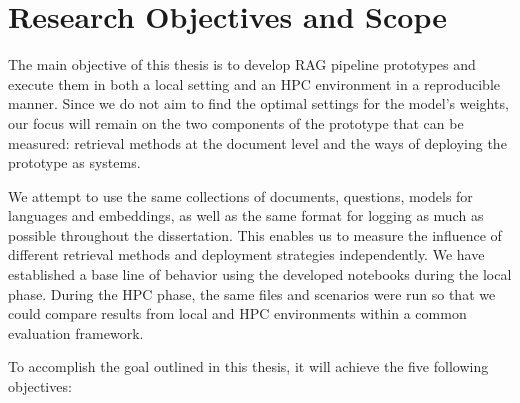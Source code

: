 \section{Research Objectives and Scope}

The main objective of this thesis is to develop \ac{RAG} pipeline prototypes and execute them in both a local setting and an \ac{HPC} environment in a reproducible manner. Since we do not aim to find the optimal settings for the model's weights, our focus will remain on the two components of the prototype that can be measured: retrieval methods at the document level and the ways of deploying the prototype as systems.

We attempt to use the same collections of documents, questions, models for languages and embeddings, as well as the same format for logging as much as possible throughout the dissertation. This enables us to measure the influence of different retrieval methods and deployment strategies independently. We have established a base line of behavior using the developed notebooks during the local phase. During the \ac{HPC} phase, the same files and scenarios were run so that we could compare results from local and HPC environments within a common evaluation framework.

To accomplish the goal outlined in this thesis, it will achieve the five following objectives:

